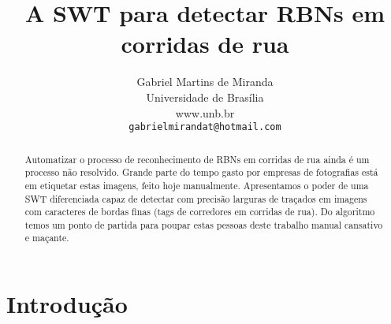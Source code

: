 \documentclass[10pt,twocolumn,letterpaper]{article}
\begin{document}
\title{A SWT para detectar RBNs em corridas de rua}

\author{Gabriel Martins de Miranda\\
Universidade de Bras\'ilia\\
www.unb.br\\
{\tt\small gabrielmirandat@hotmail.com}
}

\maketitle
\thispagestyle{empty}


\begin{abstract}
   Automatizar o processo de reconhecimento de RBNs em corridas de rua ainda \'e um processo n\~ao resolvido. Grande parte 
   do tempo gasto por empresas de fotografias est\'a em etiquetar estas imagens, feito hoje manualmente. Apresentamos o poder 
   de uma SWT diferenciada capaz de detectar com precis\~ao larguras de tra\c{c}ados em imagens com caracteres de bordas finas
   (tags de corredores em corridas de rua). Do algoritmo temos um ponto de partida para poupar estas pessoas deste trabalho 
   manual cansativo e ma\c{c}ante.
\end{abstract}

\section{Introdu\c{c}\~ao}

\end{document}
